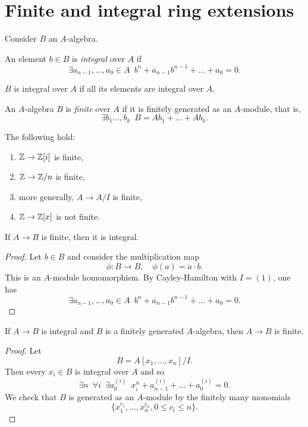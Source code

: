 \section{Finite and integral ring extensions}
Consider $B$ an $A$-algebra.

\begin{df}
  An element $b \in B$ is \textit{integral} over $A$ if
  \[ \exists a_{n-1}, \dotsc, a_0 \in A \enspace b^n + a_{n-1} b^{n-1} + \dotso + a_0 = 0.\]

  $B$ is integral over $A$ if all its elements are integral over $A$.
\end{df}

\begin{df}
  An $A$-algebra $B$ is \textit{finite} over $A$ if it is finitely generated as an $A$-module, that is,
  \[ \exists b_1 \dotsc, b_k \enspace B = A b_1 + \dotso + A b_k.\]
\end{df}

\begin{example}
  The following hold:
  \begin{enumerate}
  \item $\mathbb Z \to \mathbb Z[i]$ is finite,
  \item $\mathbb Z \to \mathbb Z /{n}$ is finite,
  \item more generally, $A \to A/{I}$ is finite,
  \item $\mathbb Z \to \mathbb Z[x]$ is not finite.
  \end{enumerate}
\end{example}

\begin{lemma}
  If $A \to B$ is finite, then it is integral.
\end{lemma}
\begin{proof}
  Let $b \in B$ and consider the multiplication map
  \[ \phi \colon B \to B, \quad \phi(a) = a \cdot b.\]
  This is an $A$-module homomorphism.
  By Cayley-Hamilton with $I = (1)$, one has
  \[ \exists a_{n-1}, \dotsc, a_0 \in A \enspace b^n + a_{n-1} b^{n-1} + \dotso + a_0 = 0.\]
\end{proof}

\begin{lemma}
  \label{lem-integral-fingen-fin}
  If $A \to B$ is integral and $B$ is a finitely generated $A$-algebra, then $A \to B$ is finite.
\end{lemma}
\begin{proof}
  Let
  \[ B = A[x_1, \dotsc, x_n]/{I}.\]
  Then every $x_i \in B$ is integral over $A$ and so
  \[ \exists n \enspace \forall i \enspace \exists a_0^{(i)} \enspace x_i^n + a_{n-1}^{(i)} + \dotso + a_0^{(i)} = 0.\]
  We check that $B$ is generated as an $A$-module by the finitely many monomials
  \[ \{ x_1^{c_1}, \dotsc, x_n^{c_n}, 0 \leq c_i \leq n\}.\]
\end{proof}

